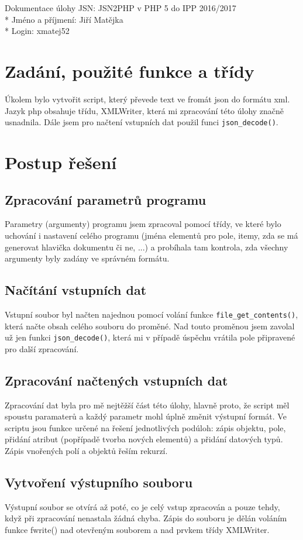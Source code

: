\documentclass[a4paper, 10pt]{article}
\begin{document}
    Dokumentace úlohy JSN: JSN2PHP v PHP 5 do IPP 2016/2017 \\*
    Jméno a příjmení: Jiří Matějka \\*
    Login: xmatej52
    \section{Zadání, použité funkce a třídy}
        Úkolem bylo vytvořit script, který převede text ve fromát json do formátu
        xml. Jazyk php obsahuje třídu, XMLWriter, která mi zpracování této úlohy
        značně usnadnila. Dále jsem pro načtení vstupních dat použil funci
        \texttt{json\_decode()}.
    \section{Postup řešení}
        \subsection{Zpracování parametrů programu}
            Parametry (argumenty) programu jsem zpracoval pomocí třídy, ve které
            bylo uchování i nastavení celého programu (jména elementů pro pole,
            itemy, zda se má generovat hlavička dokumentu či ne, ...) a probíhala
            tam kontrola, zda všechny argumenty byly zadány ve správném formátu.
        \subsection{Načítání vstupních dat}
            Vstupní soubor byl načten najednou pomocí volání funkce \texttt{file\_get\_contents()},
            která načte obsah celého souboru do proměné. Nad touto proměnou jsem
            zavolal už jen funkci \texttt{json\_decode()}, která mi v případě úspěchu vrátila
            pole připravené pro další zpracování.
        \subsection{Zpracování načtených vstupních dat}
            Zpracování dat byla pro mě nejtěžší část této úlohy, hlavně proto, že
            script měl spoustu paramaterů a každý parametr mohl úplně změnit
            výstupní formát. Ve scriptu jsou funkce určené na řešení jednotlivých
            podúloh: zápis objektu, pole, přidání atribut (popřípadě tvorba nových
            elementů) a přidání datových typů. Zápis vnořených polí a objektů
            řeším rekurzí.
        \subsection{Vytvoření výstupního souboru}
            Výstupní soubor se otvírá až poté, co je celý vstup zpracován a pouze
            tehdy, když při zpracování nenastala žádná chyba. Zápis do souboru
            je dělán voláním funkce fwrite() nad otevřeným souborem a nad prvkem
            třídy XMLWriter.
\end{document}
